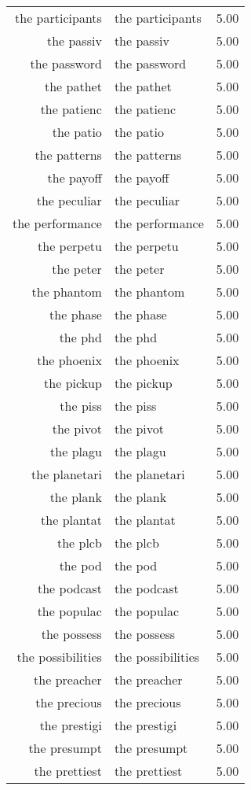 \begin{table}[ht]
\begin{tabular}{rlr}
  the participants & the participants & 5.00 \\ 
  the passiv & the passiv & 5.00 \\ 
  the password & the password & 5.00 \\ 
  the pathet & the pathet & 5.00 \\ 
  the patienc & the patienc & 5.00 \\ 
  the patio & the patio & 5.00 \\ 
  the patterns & the patterns & 5.00 \\ 
  the payoff & the payoff & 5.00 \\ 
  the peculiar & the peculiar & 5.00 \\ 
  the performance & the performance & 5.00 \\ 
  the perpetu & the perpetu & 5.00 \\ 
  the peter & the peter & 5.00 \\ 
  the phantom & the phantom & 5.00 \\ 
  the phase & the phase & 5.00 \\ 
  the phd & the phd & 5.00 \\ 
  the phoenix & the phoenix & 5.00 \\ 
  the pickup & the pickup & 5.00 \\ 
  the piss & the piss & 5.00 \\ 
  the pivot & the pivot & 5.00 \\ 
  the plagu & the plagu & 5.00 \\ 
  the planetari & the planetari & 5.00 \\ 
  the plank & the plank & 5.00 \\ 
  the plantat & the plantat & 5.00 \\ 
  the plcb & the plcb & 5.00 \\ 
  the pod & the pod & 5.00 \\ 
  the podcast & the podcast & 5.00 \\ 
  the populac & the populac & 5.00 \\ 
  the possess & the possess & 5.00 \\ 
  the possibilities & the possibilities & 5.00 \\ 
  the preacher & the preacher & 5.00 \\ 
  the precious & the precious & 5.00 \\ 
  the prestigi & the prestigi & 5.00 \\ 
  the presumpt & the presumpt & 5.00 \\ 
  the prettiest & the prettiest & 5.00 \\ 

\end{tabular}
\end{table}
